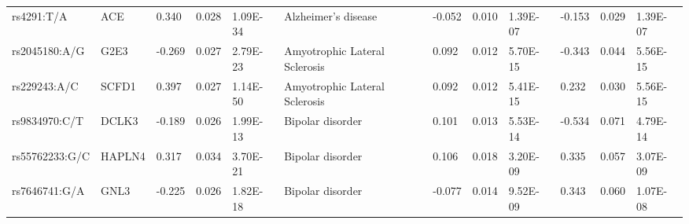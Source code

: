 \begin{table}[]
{\begin{tabular}{llllllllllll}
		\rowcolor[HTML]{E0E0E0}rs4291:T/A                       & ACE                               & 0.340                             & 0.028                           & 1.09E-34                       & Alzheimer’s disease                        & -0.052                            & 0.010                           & 1.39E-07                       & -0.153                          & 0.029                           & 1.39E-07                       \\
		\rowcolor[HTML]{BEBEBE}rs2045180:A/G                    & G2E3                              & -0.269                            & 0.027                           & 2.79E-23                       & Amyotrophic Lateral Sclerosis              & 0.092                             & 0.012                           & 5.70E-15                       & -0.343                          & 0.044                           & 5.56E-15                       \\
		\rowcolor[HTML]{BEBEBE}rs229243:A/C                     & SCFD1                             & 0.397                             & 0.027                           & 1.14E-50                       & Amyotrophic Lateral Sclerosis              & 0.092                             & 0.012                           & 5.41E-15                       & 0.232                           & 0.030                           & 5.56E-15                       \\
		\rowcolor[HTML]{E0E0E0}rs9834970:C/T                    & DCLK3                             & -0.189                            & 0.026                           & 1.99E-13                       & Bipolar disorder                           & 0.101                             & 0.013                           & 5.53E-14                       & -0.534                          & 0.071                           & 4.79E-14                       \\
		\rowcolor[HTML]{E0E0E0}rs55762233:G/C                   & HAPLN4                            & 0.317                             & 0.034                           & 3.70E-21                       & Bipolar disorder                           & 0.106                             & 0.018                           & 3.20E-09                       & 0.335                           & 0.057                           & 3.07E-09                       \\
		\rowcolor[HTML]{E0E0E0}rs7646741:G/A                    & GNL3                              & -0.225                            & 0.026                           & 1.82E-18                       & Bipolar disorder                           & -0.077                            & 0.014                           & 9.52E-09                       & 0.343                           & 0.060                           & 1.07E-08                       \\

\end{tabular}}
\end{table}
